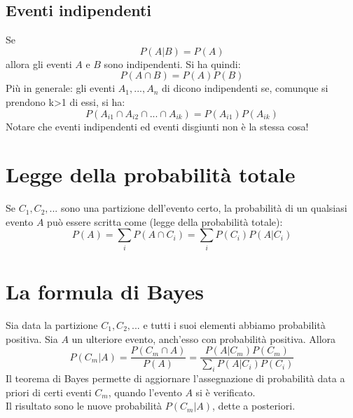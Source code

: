 \documentclass{article}
\begin{document}
\subsection{Eventi indipendenti}
Se
\begin{equation}
P(A|B) = P(A)
\end{equation}
allora gli eventi $A$ e $B$ sono indipendenti. Si ha quindi:
\begin{equation}
P({A}\cap{B}) = P(A)P(B)
\end{equation}
Più in generale: gli eventi $A_1,...,A_n$ di dicono indipendenti se, comunque si prendono k>1 di essi, si ha:
\begin{equation}
P({A_{i1}}\cap{A_{i2}}\cap{...}\cap{A_{ik}}) = P(A_{i1})P(A_{ik})
\end{equation}
Notare che eventi indipendenti ed eventi disgiunti non è la stessa cosa!
\newpage
\section{Legge della probabilità totale}
Se $C_1,C_2,...$ sono una partizione dell'evento certo, la probabilità di un qualsiasi evento $A$ può essere scritta come (legge della probabilità totale):
\begin{equation}
P(A) = \sum\limits_{i}{ P({A}\cap{C_i})} = \sum\limits_{i}{ P({C_i})P(A|C_i)}
\end{equation}
\section{La formula di Bayes}
Sia data la partizione $C_1, C_2,...$ e tutti i suoi elementi abbiamo probabilità positiva. Sia $A$ un ulteriore evento, anch'esso con probabilità positiva. Allora
\begin{equation}
P(C_m|A) = \frac{P({C_m}\cap{A})}{P(A)} = \frac{P(A|C_m)P(C_m)}{\sum\limits_{i}{P(A|C_i)P(C_i)}}
\end{equation}
Il teorema di Bayes permette di aggiornare l'assegnazione di probabilità data a priori di certi eventi $C_m$, quando l'evento $A$ si è verificato.\\
Il risultato sono le nuove probabilità $P(C_m|A)$, dette a posteriori.
\end{document}
